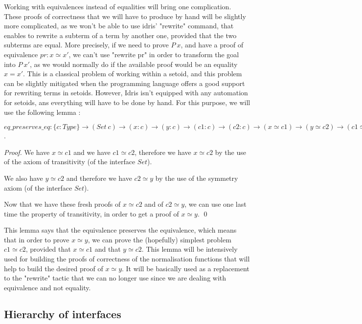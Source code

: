 Working with equivalences instead of equalities will bring one complication. These proofs of correctness that we will have to produce by hand will be slightly more complicated, as we won't be able to use idris' "rewrite" command, that enables to rewrite a subterm of a term by another one, provided that the two subterms are equal. More precisely, if we need to prove $P\ x$, and have a proof of equivalence $pr:x \simeq x'$, we can't use "rewrite pr" in order to transform the goal into $P\ x'$, as we would normally do if the available proof would be an equality $x=x'$. This is a classical problem of working within a setoid, and this problem can be slightly mitigated when the programming language offers a good support for rewriting terms in setoids. However, Idris isn't equipped with any automation for setoids, ans everything will have to be done by hand. For this purpose, we will use the following lemma :

$eq\_preserves\_eq : \{c:Type\} \rightarrow (Set\ c) \rightarrow (x:c) \rightarrow (y:c) \rightarrow (c1:c) \rightarrow (c2:c) \rightarrow (x \simeq c1) \rightarrow (y \simeq c2) \rightarrow (c1 \simeq c2) \rightarrow (x \simeq y)$.

\begin{proof}
We have $x \simeq c1$ and we have $c1 \simeq c2$, therefore we have $x \simeq c2$ by the use of the axiom of transitivity (of the interface $Set$). \

We also have $y \simeq c2$ and therefore we have $c2 \simeq y$ by the use of the symmetry axiom (of the interface $Set$). \

Now that we have these fresh proofs of $x \simeq c2$ and of $c2 \simeq y$, we can use one last time the property of transitivity, in order to get a proof of $x \simeq y$.
\qed
\end{proof}

This lemma says that the equivalence preserves the equivalence, which means that in order to prove $x \simeq y$, we can prove the (hopefully) simplest problem $c1 \simeq c2$, provided that $x \simeq c1$ and that $y \simeq c2$. This lemma will be intensively used for building the proofs of correctness of the normalisation functions that will help to build the desired proof of $x \simeq y$. It will be basically used as a replacement to the "rewrite" tactic that we can no longer use since we are dealing with equivalence and not equality.

		\subsection{Hierarchy of interfaces}

